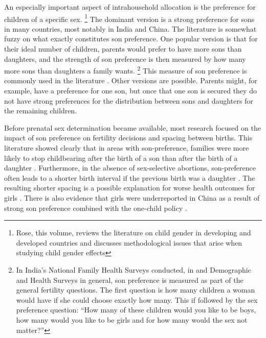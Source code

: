 \documentclass[letterpaper,12pt]{article}
\begin{document}
An especially important aspect of intrahousehold allocation is the
preference for children of a specific sex.%
\footnote{
Rose, this volume, reviews the literature on child gender in developing
and developed countries and discusses methodological issues that arise
when studying child gender effects} The dominant version is a strong
preference for sons in many countries, most notably in India and China. 
The literature is somewhat fuzzy on what exactly constitutes son
preference. 
One popular version is that for their ideal number of children, parents
would prefer to have more sons than daughters, and the strength of son
preference is then measured by how many more sons than daughters a
family wants.%
\footnote{
In India's National Family Health Surveys conducted, in and Demographic
and Health Surveys in general, son preference is measured as part of the
general fertility questions. 
The first question is how many children a woman would have if she could
choose exactly how many. 
This if followed by the sex preference question: ``How many of these
children would you like to be boys, how many would you like to be girls
and for how many would the sex not matter?''} This measure of son
preference is commonly used in the literature
\citep[e.g.]{clark00,Jensen2009,Hu2015}. 
Other versions are possible. 
Parents might, for example, have a preference for one son, but once that
one son is secured they do not have strong preferences for the
distribution between sons and daughters for the remaining children.

Before prenatal sex determination became available, most research
focused on the impact of son preference on fertility decisions and
spacing between births. 
This literature showed clearly that in areas with son-preference,
families were more likely to stop childbearing after the birth of a son
than after the birth of a daughter \citep[see, for
example,][]{Das1987,Arnold1997,clark00,filmer09}. 
Furthermore, in the absence of sex-selective abortions, son-preference
often leads to a shorter birth interval if the previous birth was a
daughter \citep[see, for
example,][]{Das1987,Rahman1993,Pong1994,Haughton1996,Arnold1997}. 
The resulting shorter spacing is a possible explanation for worse health
outcomes for girls
\citep{arnold98,Whitworth2002,Rutstein2005,Conde-Agudelo2006}. 
There is also evidence that girls were underreported in China as a result
of strong son preference combined with the one-child policy
\citep{Merli2000,Goodkind2011}.
\end{document}
